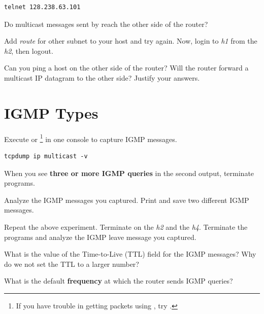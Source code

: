 \documentclass{../UTNetLab}
\begin{document}
\begin{lstlisting}
telnet 128.238.63.101
\end{lstlisting}
Do multicast messages sent by  reach the other side of the router?

Add \textit{route} for other subnet to your host and try  again.
Now, login to \textit{h1} from the \textit{h2}, then logout.

\begin{report}
    \item Can you ping a host on the other side of the router?
    Will the router forward a multicast IP datagram to the other side?
    Justify your answers.
\end{report}

\section{IGMP Types}
Execute  or \footnote{If you have trouble in getting packets using , try .} in one console to capture IGMP messages.

\begin{lstlisting}[emph={eth0},morekeywords={[3]multicast}]
tcpdump ip multicast -v
\end{lstlisting}
When you see \textbf{three or more IGMP queries} in the second  output, terminate  programs.

Analyze the IGMP messages you captured.
Print and save two different IGMP messages.

Repeat the above experiment.
Terminate  on the \textit{h2} and the \textit{h4}.
Terminate the  programs and analyze the IGMP leave message you captured.

\begin{report}
    \item What is the value of the Time-to-Live (TTL) field for the IGMP messages?
    Why do we not set the TTL to a larger number?

    \item What is the default \textbf{frequency} at which the router sends IGMP queries?
\end{report}
\end{document}

